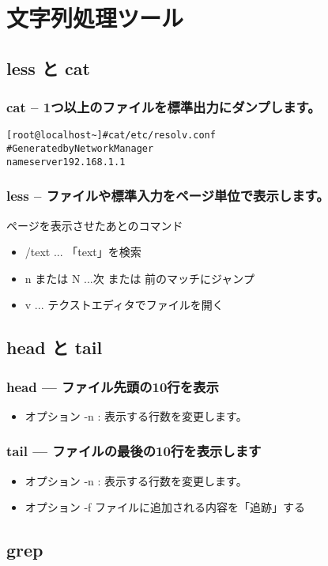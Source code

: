 \chapter{文字列処理ツール}
\label{chap:ch02}

\section{less と cat}

\subsection{cat -- 1つ以上のファイルを標準出力にダンプします。}

\begin{reviewemlist}
\begin{alltt}
[root@localhost \textasciitilde{}]\# cat /etc/resolv.conf
\# Generated by NetworkManager
nameserver 192.168.1.1
\end{alltt}
\end{reviewemlist}

\subsection{less -- ファイルや標準入力をページ単位で表示します。}

ページを表示させたあとのコマンド

\begin{itemize}
\item /text ... 「text」を検索
\item n または N ...次 または 前のマッチにジャンプ
\item v ... テクストエディタでファイルを開く
\end{itemize}

\begin{reviewcolumn}
\end{reviewcolumn}

\section{head と tail}

\subsection{head --- ファイル先頭の10行を表示}

\begin{itemize}
\item オプション   -n : 表示する行数を変更します。
\end{itemize}

\subsection{tail --- ファイルの最後の10行を表示します}

\begin{itemize}
\item オプション   -n : 表示する行数を変更します。
\item オプション   -f ファイルに追加される内容を「追跡」する
\end{itemize}

\section{grep}
